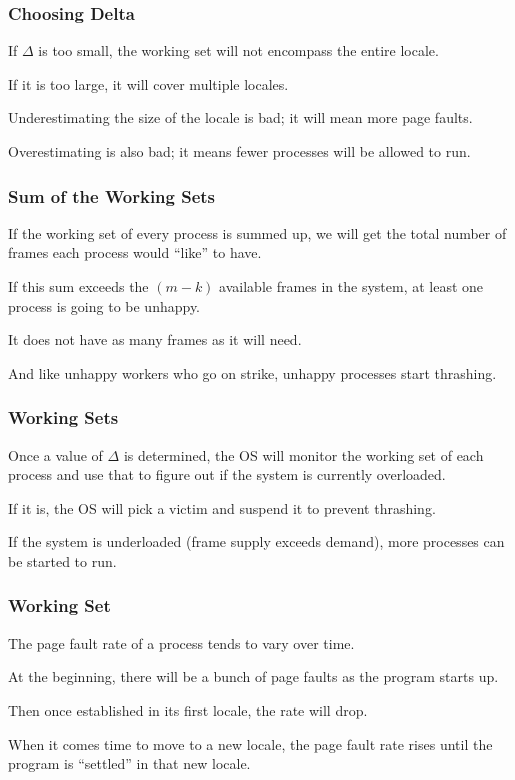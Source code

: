 \begin{frame}
\frametitle{Choosing Delta}

If $\Delta$ is too small, the working set will not encompass the entire locale. 

If it is too large, it will cover multiple locales. 

Underestimating the size of the locale is bad; it will mean more page faults.


Overestimating is also bad; it means fewer processes will be allowed to run.

\end{frame}

\begin{frame}
\frametitle{Sum of the Working Sets}

If the working set of every process is summed up, we will get the total number of frames each process would ``like'' to have. 

If this sum exceeds the $(m-k)$ available frames in the system, at least one process is going to be unhappy.

It does not have as many frames as it will need. 

And like unhappy workers who go on strike, unhappy processes start thrashing.


\end{frame}

\begin{frame}
\frametitle{Working Sets}

Once a value of $\Delta$ is determined, the OS will monitor the working set of each process and use that to figure out if the system is currently overloaded. 

If it is, the OS will pick a victim and suspend it to prevent thrashing. 

If the system is underloaded (frame supply exceeds demand), more processes can be started to run.


\end{frame}

\begin{frame}
\frametitle{Working Set}

The page fault rate of a process tends to vary over time. 

At the beginning, there will be a bunch of page faults as the program starts up. 

Then once established in its first locale, the rate will drop. 

When it comes time to move to a new locale, the page fault rate rises until the program is ``settled'' in that new locale.


\end{frame}

